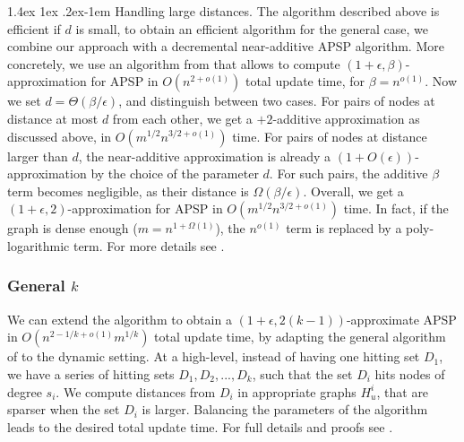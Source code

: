 \documentclass[11pt]{article}
\makeatletter
\theoremstyle{definition}
\theoremstyle{remark}
\newcommand{\sebastian}[1]{\todo[color=green!20]{S: #1}}
\renewcommand{\paragraph}{%
  \@startsection{paragraph}{4}%
  {\z@}{1.4ex \@plus 1ex \@minus .2ex}{-1em}%
  {\normalfont\normalsize\bfseries}%
}
\makeatother
\begin{document}
\begin{titlepage}
\paragraph{Handling large distances.} The algorithm described above is efficient if $d$ is small, to obtain an efficient algorithm for the general case, we combine our approach with a decremental near-additive APSP algorithm. More concretely, we use an algorithm from \cite{HKN14} that allows to compute $(1+\epsilon,\beta)$-approximation for APSP in $O(n^{2+o(1)})$ total update time, for $\beta=n^{o(1)}$. Now we set $d=\Theta(\beta/\epsilon)$, and distinguish between two cases. For pairs of nodes at distance at most $d$ from each other, we get a $+2$-additive approximation as discussed above, in $O(m^{1/2}n^{3/2+o(1)})$ time. For pairs of nodes at distance larger than $d$, the near-additive approximation is already a $(1+O(\epsilon))$-approximation by the choice of the parameter $d$. For such pairs, the additive $\beta$ term becomes negligible, as their distance is $\Omega(\beta/\epsilon)$. 
Overall, we get a $(1+\epsilon,2)$-approximation for APSP in $O(m^{1/2}n^{3/2+o(1)})$ time. In fact, if the graph is dense enough ($m=n^{1+\Omega(1)}$), the $n^{o(1)}$ term is replaced by a poly-logarithmic term. For more details see . 

\subsubsection{General \texorpdfstring{$k$}{k}}
We can extend the algorithm to obtain a $(1+\epsilon,2(k-1))$-approximate APSP in $O(n^{2-1/k+o(1)}m^{1/k})$ total update time, by adapting the general algorithm of \cite{DHZ00} to the dynamic setting.
At a high-level, instead of having one hitting set $D_1$, we have a series of hitting sets $D_1,D_2,...,D_k$, such that the set $D_i$ hits nodes of degree $s_i$. We compute distances from $D_i$ in appropriate graphs $H_u^i$, that are sparser when the set $D_i$ is larger. Balancing the parameters of the algorithm leads to the desired total update time. For full details and proofs see .


\end{titlepage}
\end{document}

